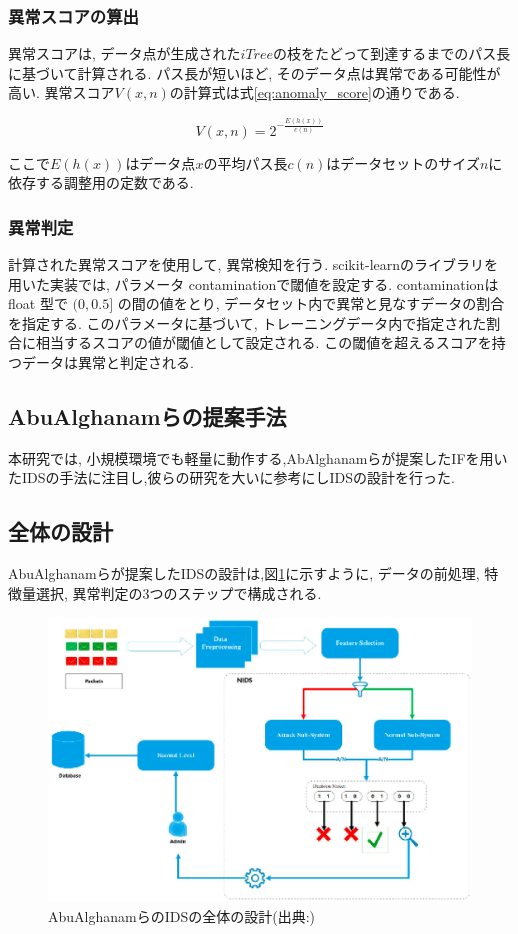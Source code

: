 \documentclass{css}
\begin{document}
\subsubsection{異常スコアの算出}

異常スコアは, データ点が生成された$iTree$の枝をたどって到達するまでのパス長に基づいて計算される. パス長が短いほど, そのデータ点は異常である可能性が高い. 異常スコア$V(x,n)$の計算式は式\ref{eq:anomaly_score}の通りである. 


\begin{equation}
    V(x, n) = 2^{-\frac{E(h(x))}{c(n)}}
    \label{eq:anomaly_score}
\end{equation}

ここで$E(h(x))$はデータ点$x$の平均パス長$c(n)$はデータセットのサイズ$n$に依存する調整用の定数である. 

\subsubsection{異常判定}
計算された異常スコアを使用して, 異常検知を行う. scikit-learnのライブラリを用いた実装では, パラメータ contaminationで閾値を設定する. contaminationは float 型で $(0, 0.5]$ の間の値をとり, データセット内で異常と見なすデータの割合を指定する. このパラメータに基づいて, トレーニングデータ内で指定された割合に相当するスコアの値が閾値として設定される. この閾値を超えるスコアを持つデータは異常と判定される. 


\subsection{AbuAlghanamらの提案手法}
本研究では, 小規模環境でも軽量に動作する,AbAlghanamらが提案したIFを用いたIDSの手法\cite{AbuAlghanam2023-sx}に注目し,彼らの研究を大いに参考にしIDSの設計を行った. 

\subsection{全体の設計}
AbuAlghanamらが提案したIDSの設計\cite{AbuAlghanam2023-sx}は,図\ref{fig:IDS}に示すように, データの前処理, 特徴量選択, 異常判定の3つのステップで構成される. 

\begin{figure}[ht]
    \centering
    \includegraphics[width=0.9\linewidth]{pictures/eps/system.eps}
    \caption{AbuAlghanamらのIDSの全体の設計(出典:\cite{AbuAlghanam2023-sx})}
    \label{fig:IDS}
\end{figure}
\end{document}
